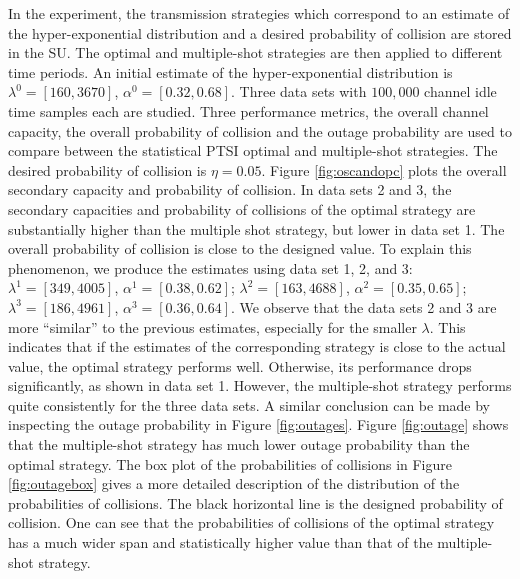 \documentclass[10pt,final,journal,letterpaper]{IEEEtran}
\begin{document}
\par
In the experiment, the transmission strategies which correspond to an estimate of the hyper-exponential distribution and a desired probability of collision are stored in the SU. The optimal and multiple-shot strategies are then applied to different time periods. An initial estimate of the hyper-exponential distribution is $\lambda^0=[160, 3670]$, $\alpha^0=[0.32, 0.68]$. Three data sets with $100,000$ channel idle time samples each are studied. Three performance metrics, the overall channel capacity, the overall probability of collision and the outage probability are used to compare between the statistical PTSI optimal and multiple-shot strategies. The desired probability of collision is $\eta=0.05$. Figure \ref{fig:oscandopc} plots the overall secondary capacity and probability of collision. In data sets 2 and 3, the secondary capacities and probability of collisions of the optimal strategy are substantially higher than the multiple shot strategy, but lower in data set 1. The overall probability of collision is close to the designed value. To explain this phenomenon, we produce the estimates using data set 1, 2, and 3: $\lambda^1=[349, 4005]$, $\alpha^1=[0.38, 0.62]$; $\lambda^2=[163, 4688]$, $\alpha^2=[0.35, 0.65]$; $\lambda^3=[186, 4961]$, $\alpha^3=[0.36, 0.64]$. We observe that the data sets 2 and 3 are more ``similar'' to the previous estimates, especially for the smaller $\lambda$. This indicates that if the estimates of the corresponding strategy is close to the actual value, the optimal strategy performs well. Otherwise, its performance drops significantly, as shown in data set 1. However, the multiple-shot strategy performs quite consistently for the three data sets. A similar conclusion can be made by inspecting the outage probability in Figure \ref{fig:outages}. Figure \ref{fig:outage} shows that the multiple-shot strategy has much lower outage probability than the optimal strategy. The box plot of the probabilities of collisions in Figure \ref{fig:outagebox} gives a more detailed description of the distribution of the probabilities of collisions. The black horizontal line is the designed probability of collision. One can see that the probabilities of collisions of the optimal strategy has a much wider span and statistically higher value than that of the multiple-shot strategy.
\begin{figure*}[!t]
  \centering
  \caption{Overall secondary capacity and probability of collision in three data sets.}
  \label{fig:oscandopc}
\end{figure*}
\begin{figure*}[!t]
  \centering
  \caption{Outage probability evaluated every 100 channel idle times.}
  \label{fig:outages}
\end{figure*}
\end{document}
